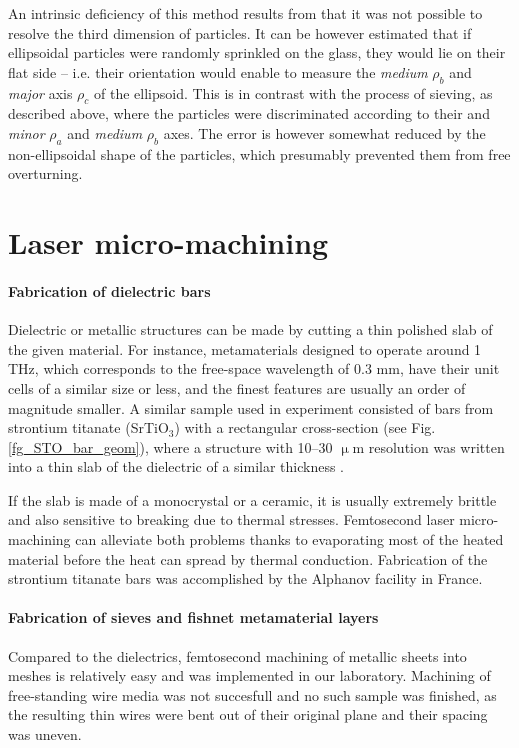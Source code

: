 An intrinsic deficiency of this method results from that it was not possible to resolve the third dimension of particles. 
It can be however estimated that if %
ellipsoidal particles were randomly sprinkled on the glass, they would lie on their flat side -- i.e. their orientation would enable to measure the \textit{medium} $\rho_b$ and \textit{major} axis $\rho_c$ of the ellipsoid. This is in contrast with the process of sieving, as described above, where the particles were discriminated according to their and \textit{minor} $\rho_a$ and \textit{medium} $\rho_b$ axes. 
The error is however somewhat reduced by the non-ellipsoidal shape of the particles, which presumably prevented them from free overturning. %

\section{Laser micro-machining}
\paragraph{Fabrication of dielectric bars}%
Dielectric or metallic structures can be made by cutting a thin polished slab of the given material. For instance, metamaterials designed to operate around 1 THz, which corresponds to the free-space wavelength of 0.3 mm, have their unit cells of a similar size or less, and the finest features are usually an order of magnitude smaller. 
A similar sample used in experiment consisted of bars from strontium titanate (SrTiO$_{3}$) with a rectangular cross-section (see Fig. \ref{fg_STO_bar_geom}), 
where a structure with 10--30 $\upmu$m resolution was written into a thin slab of the dielectric of a similar thickness \cite{yahiaoui2011tunable}.

If the slab is made of a monocrystal or a ceramic, it is usually extremely brittle and also sensitive to breaking due to thermal stresses. Femtosecond laser micro-machining can alleviate both problems thanks to evaporating most of the heated material before the heat can spread by thermal conduction. Fabrication of the strontium titanate bars was accomplished by the  Alphanov facility in France.
\paragraph{Fabrication of sieves and fishnet metamaterial layers}%
Compared to the dielectrics, femtosecond machining of metallic sheets into meshes is relatively easy and was implemented in our laboratory. Machining of free-standing wire media was not succesfull and no such sample was finished, as the resulting thin wires were bent out of their original plane and their spacing was uneven.

